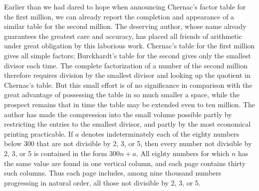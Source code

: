 \documentclass[12pt]{article}
\begin{document}
Earlier than we had dared to hope when announcing Chernac's factor table for the first million, we can already report the completion and appearance of a similar table for the second million. The deserving author, whose name already guarantees the greatest care and accuracy, has placed all friends of arithmetic under great obligation by this laborious work. Chernac's table for the first million gives all simple factors; Burckhardt's table for the second gives only the smallest divisor each time. The complete factorization of a number of the second million therefore requires division by the smallest divisor and looking up the quotient in Chernac's table. But this small effort is of no significance in comparison with the great advantage of possessing the table in so much smaller a space, while the prospect remains that in time the table may be extended even to ten million. The author has made the compression into the small volume possible partly by restricting the entries to the smallest divisor, and partly by the most economical printing practicable. If $a$ denotes indeterminately each of the eighty numbers below 300 that are not divisible by 2, 3, or 5, then every number not divisible by 2, 3, or 5 is contained in the form $300n+a$. All eighty numbers for which $n$ has the same value are found in one vertical column, and each page contains thirty such columns. Thus each page includes, among nine thousand numbers progressing in natural order, all those not divisible by 2, 3, or 5.
\end{document}

